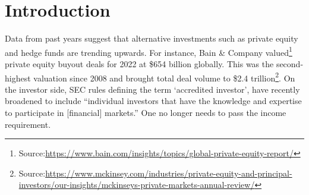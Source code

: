 \documentclass[11pt]{article}
\begin{document}


\setcounter{page}{0}
\thispagestyle{empty}







\section{Introduction} 
\label{sec:introduction}

Data from past years suggest that alternative investments such as private equity and hedge funds are trending upwards. For instance, Bain \& Company  valued\footnote{Source:\href{https://www.bain.com/insights/topics/global-private-equity-report/}{https://www.bain.com/insights/topics/global-private-equity-report/}} private equity  buyout deals for 2022 at \$654 billion globally. This was the second-highest valuation since 2008 and brought total deal volume to \$2.4 trillion\footnote{Source:\href{https://www.mckinsey.com/industries/private-equity-and-principal-investors/our-insights/mckinseys-private-markets-annual-review/}{https://www.mckinsey.com/industries/private-equity-and-principal-investors/our-insights/mckinseys-private-markets-annual-review/}}. On the investor side, SEC rules defining the term `accredited investor', have recently broadened to include ``individual investors that have the knowledge and expertise to participate in [financial] markets.'' One no longer needs to pass the income requirement. \\
\end{document}
